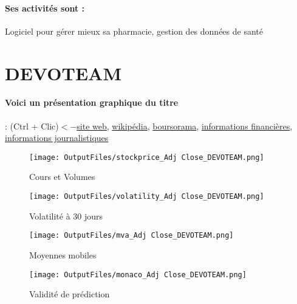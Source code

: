 \documentclass[11pt,a4paper]{report}%
\begin{document}
\paragraph{Ses activités sont : } Logiciel pour gérer mieux sa pharmacie, gestion des données de santé 
    
    \newpage

\section{DEVOTEAM}

\paragraph{Voici un présentation graphique du titre} : (Ctrl + Clic)$<-$\href{https://www.devoteam.com/investors/financial-information/}{site web}, \href{https://fr.wikipedia.org/wiki/Devoteam}{wikipédia}, \href{https://www.boursorama.com/cours/1rPDVT/}{boursorama}, \href{https://www.qwant.com/?q=site:https:%2f%2fwww.easybourse.com%2faction-societe%2fDEVOTEAM&t=web&client=ext-firefox-hp}{informations financières}, \href{https://bourse.lerevenu.com/cours-de-bourse/fiche-valeur-synthese/DEVOTEAM/DVT-FR}{informations journalistiques}
\begin{figure}[!htb]
   \begin{minipage}{0.5\textwidth}
     \centering
     \texttt{[image: OutputFiles/stockprice\_Adj Close\_DEVOTEAM.png]}
     \caption{Cours et Volumes}\label{Fig:price_DEVOTEAM}
   \end{minipage}\hfill
   \begin{minipage}{0.5\textwidth}
     \centering
     \texttt{[image: OutputFiles/volatility\_Adj Close\_DEVOTEAM.png]}
     \caption{Volatilité à 30 jours}\label{Fig:volat_DEVOTEAM}
   \end{minipage}
\end{figure}
\begin{figure}[!htb]
   \begin{minipage}{0.5\textwidth}
     \centering
     \texttt{[image: OutputFiles/mva\_Adj Close\_DEVOTEAM.png]}
     \caption{Moyennes mobiles}\label{Fig:mva_DEVOTEAM}
   \end{minipage}\hfill
   \begin{minipage}{0.5\textwidth}
     \centering
     \texttt{[image: OutputFiles/monaco\_Adj Close\_DEVOTEAM.png]}
     \caption{Validité de prédiction}\label{Fig:prediction_DEVOTEAM}
   \end{minipage}
\end{figure}
\end{document}
